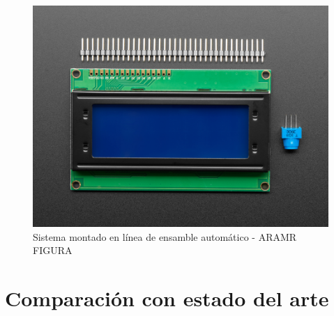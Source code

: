 \begin{figure}[htbp]
	\centering
	\includegraphics[scale=1]{./Figures/LCD.jpg}
	\caption{Sistema montado en línea de ensamble automático - ARAMR FIGURA}
	\label{fig:sistema_en_planta}
\end{figure}

\section{Comparación con estado del arte}

